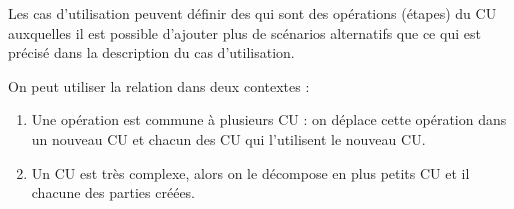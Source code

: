 Les cas d'utilisation peuvent définir des  qui sont des opérations (étapes) du \acrshort{CU} auxquelles il est possible d'ajouter plus de scénarios alternatifs que ce qui est précisé dans la description du cas d'utilisation.

On peut utiliser la relation  dans deux contextes :
\begin{enumerate}
	\item Une opération est commune à plusieurs \acrshort{CU} : on déplace cette opération dans un nouveau \acrshort{CU} et chacun des \acrshort{CU} qui l'utilisent  le nouveau \acrshort{CU}.
	\item Un \acrshort{CU} est très complexe, alors on le décompose en plus petits \acrshort{CU} et il  chacune des parties créées. 
\end{enumerate}

